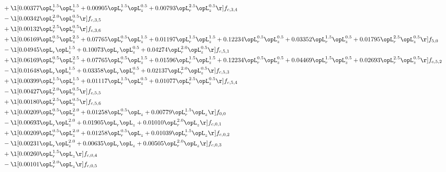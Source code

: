 \begin{alignat}{2}
& + \l[  0.00377 \opL_r^{1.5} \opL_z^{1.5} +  0.00905 \opL_r^{1.5} \opL_z^{0.5} +  0.00793 \opL_r^{2.5} \opL_z^{0.5}  \r] f_{c,3,4} \nonumber \\ 
& - \l[  0.00342 \opL_r^{2.0} \opL_z^{0.5}  \r] f_{c,3,5} \nonumber \\ 
& + \l[  0.00132 \opL_r^{2.5} \opL_z^{0.5}  \r] f_{c,3,6} \nonumber \\ 
& + \l[  0.06169 \opL_r^{0.5} \opL_z^{2.5} +  0.07765 \opL_r^{0.5} \opL_z^{1.5} +  0.01197 \opL_r^{1.5} \opL_z^{1.5} +  0.12234 \opL_r^{0.5} \opL_z^{0.5} +  0.03352 \opL_r^{1.5} \opL_z^{0.5} +  0.01795 \opL_r^{2.5} \opL_z^{0.5}  \r] f_{5,0} \nonumber \\ 
& - \l[  0.04945 \opL_r \opL_z^{1.5} +  0.10073 \opL_r \opL_z^{0.5} +  0.04274 \opL_r^{2.0} \opL_z^{0.5}  \r] f_{c,5,1} \nonumber \\ 
& + \l[  0.06169 \opL_r^{0.5} \opL_z^{2.5} +  0.07765 \opL_r^{0.5} \opL_z^{1.5} +  0.01596 \opL_r^{1.5} \opL_z^{1.5} +  0.12234 \opL_r^{0.5} \opL_z^{0.5} +  0.04469 \opL_r^{1.5} \opL_z^{0.5} +  0.02693 \opL_r^{2.5} \opL_z^{0.5}  \r] f_{c,5,2} \nonumber \\ 
& - \l[  0.01648 \opL_r \opL_z^{1.5} +  0.03358 \opL_r \opL_z^{0.5} +  0.02137 \opL_r^{2.0} \opL_z^{0.5}  \r] f_{c,5,3} \nonumber \\ 
& + \l[  0.00399 \opL_r^{1.5} \opL_z^{1.5} +  0.01117 \opL_r^{1.5} \opL_z^{0.5} +  0.01077 \opL_r^{2.5} \opL_z^{0.5}  \r] f_{c,5,4} \nonumber \\ 
& - \l[  0.00427 \opL_r^{2.0} \opL_z^{0.5}  \r] f_{c,5,5} \nonumber \\ 
& + \l[  0.00180 \opL_r^{2.5} \opL_z^{0.5}  \r] f_{c,5,6} \nonumber \\ 
& + \l[  0.00209 \opL_r^{0.5} \opL_z^{2.0} +  0.01258 \opL_r^{0.5} \opL_z +  0.00779 \opL_r^{1.5} \opL_z  \r] f_{0,0} \nonumber \\ 
& - \l[  0.00693 \opL_r \opL_z^{2.0} +  0.01905 \opL_r \opL_z +  0.01010 \opL_r^{2.0} \opL_z  \r] f_{c,0,1} \nonumber \\ 
& + \l[  0.00209 \opL_r^{0.5} \opL_z^{2.0} +  0.01258 \opL_r^{0.5} \opL_z +  0.01039 \opL_r^{1.5} \opL_z  \r] f_{c,0,2} \nonumber \\ 
& - \l[  0.00231 \opL_r \opL_z^{2.0} +  0.00635 \opL_r \opL_z +  0.00505 \opL_r^{2.0} \opL_z  \r] f_{c,0,3} \nonumber \\ 
& + \l[  0.00260 \opL_r^{1.5} \opL_z  \r] f_{c,0,4} \nonumber \\ 
& - \l[  0.00101 \opL_r^{2.0} \opL_z  \r] f_{c,0,5} \nonumber \\ 

\end{alignat}
